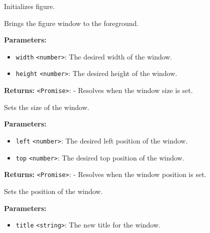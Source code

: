 \documentclass[12pt,a4paper]{article}
\begin{document}
\noindent Initializes figure.

\vspace{5mm}
\noindent {}


\noindent Brings the figure window to the foreground.

\vspace{5mm}
\noindent {}


\noindent \textbf{Parameters:}
\begin{itemize}
  \item \texttt{width} \texttt{<number>}: The desired width of the window.
  \item \texttt{height} \texttt{<number>}: The desired height of the window.
\end{itemize}

\noindent \textbf{Returns:} \texttt{<Promise>}: - Resolves when the window size is set.

\noindent Sets the size of the window.

\vspace{5mm}
\noindent {}


\noindent \textbf{Parameters:}
\begin{itemize}
  \item \texttt{left} \texttt{<number>}: The desired left position of the window.
  \item \texttt{top} \texttt{<number>}: The desired top position of the window.
\end{itemize}

\noindent \textbf{Returns:} \texttt{<Promise>}: - Resolves when the window position is set.

\noindent Sets the position of the window.

\vspace{5mm}
\noindent {}


\noindent \textbf{Parameters:}
\begin{itemize}
  \item \texttt{title} \texttt{<string>}: The new title for the window.
\end{itemize}
\end{document}
